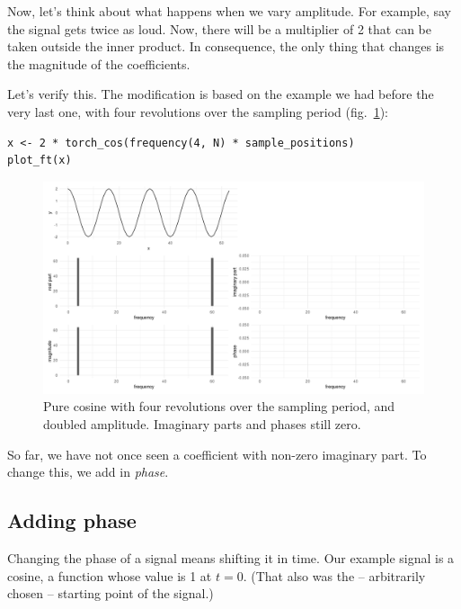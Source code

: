 \documentclass[
  letterpaper,
]{krantz}
\begin{document}
Now, let's think about what happens when we vary amplitude. For example,
say the signal gets twice as loud. Now, there will be a multiplier of 2
that can be taken outside the inner product. In consequence, the only
thing that changes is the magnitude of the coefficients.

Let's verify this. The modification is based on the example we had
before the very last one, with four revolutions over the sampling period
(fig.~\ref{fig-dft-cos-mult-amplitude}):

\begin{verbatim}
x <- 2 * torch_cos(frequency(4, N) * sample_positions)
plot_ft(x)
\end{verbatim}

\begin{figure}[H]

{\centering \includegraphics{images/dft-cos-mult-amplitude.png}

}

\caption{\label{fig-dft-cos-mult-amplitude}Pure cosine with four
revolutions over the sampling period, and doubled amplitude. Imaginary
parts and phases still zero.}

\end{figure}

So far, we have not once seen a coefficient with non-zero imaginary
part. To change this, we add in \emph{phase}.

\hypertarget{adding-phase}{%
\subsection{\texorpdfstring{Adding
phase}{Adding phase}}\label{adding-phase}}

Changing the phase of a signal means shifting it in time. Our example
signal is a cosine, a function whose value is 1 at \(t=0\). (That also
was the -- arbitrarily chosen -- starting point of the signal.)
\end{document}
